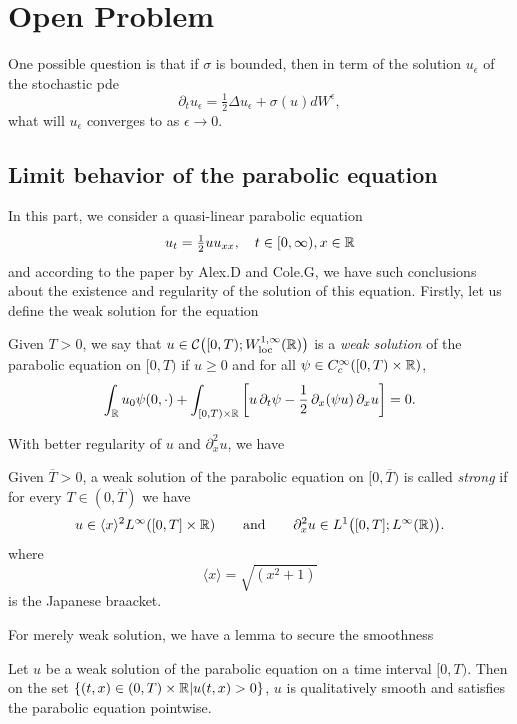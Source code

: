 \section{Open Problem}

One possible question is that if $\sigma$ is bounded, then in term of the solution $u_{\epsilon}$ of the stochastic pde
\[
\partial_t u_{\epsilon} = \tfrac{1}{2}\Delta u_{\epsilon} + \sigma(u)dW^{\epsilon},
\]
what will $u_{\epsilon}$ converges to as $\epsilon \to 0$.

\subsection{Limit behavior of the parabolic equation}

In this part, we consider a quasi-linear parabolic equation
\[
u_t = \tfrac12 uu_{xx},\quad t\in [0,\infty),x\in\mathbb{R} \label{eq: paraboliceq}
\]
and according to the paper by Alex.D and Cole.G, we have such conclusions about the existence and regularity of the solution of this equation. Firstly, let us define the weak solution for the equation

\begin{definition}
Given $T>0$, we say that
\(
u \in \mathcal{C}\big([0,T);W^{1,\infty}_{\mathrm{loc}}(\mathbb{R})\big)
\)
is a \emph{weak solution} of the parabolic equation on $[0,T)$ if $u\ge 0$ and for all
$\psi\in C_c^{\infty}([0,T)\times \mathbb{R})$,
\begin{equation}
\int_{\mathbb{R}} u_0\psi(0,\cdot)
+ \int_{[0,T)\times\mathbb{R}}
\left[u\,\partial_t\psi - \frac12 \,\partial_x(\psi u)\,\partial_x u\right] = 0.
\label{eq:weak}
\end{equation}
\end{definition}

With better regularity of $u$ and $\partial_x^2 u$, we have

\begin{definition}
Given $\overline T>0$, a weak solution of the parabolic equation on $[0,\overline T)$ is called
\emph{strong} if for every $T\in (0,\overline T)$ we have
\[
u \in \langle x\rangle^{2}L^{\infty}([0,T]\times\mathbb{R})
\qquad\text{and}\qquad
\partial_x^2 u \in L^1\big([0,T];L^{\infty}(\mathbb{R})\big).
\]
where
\[
\langle x\rangle = \sqrt{(x^2+1)}
\]
is the Japanese braacket.
\end{definition}

For merely weak solution, we have a lemma to secure the smoothness

\begin{lemma}
    Let $u$ be a weak solution of the parabolic equation on a time interval $[0,  T)$. Then on the set $\{(t, x) \in (0, T) \times \mathbb{R} | u(t,x) > 0\}$, $u$  is qualitatively smooth and satisfies the parabolic equation pointwise.
\end{lemma}

